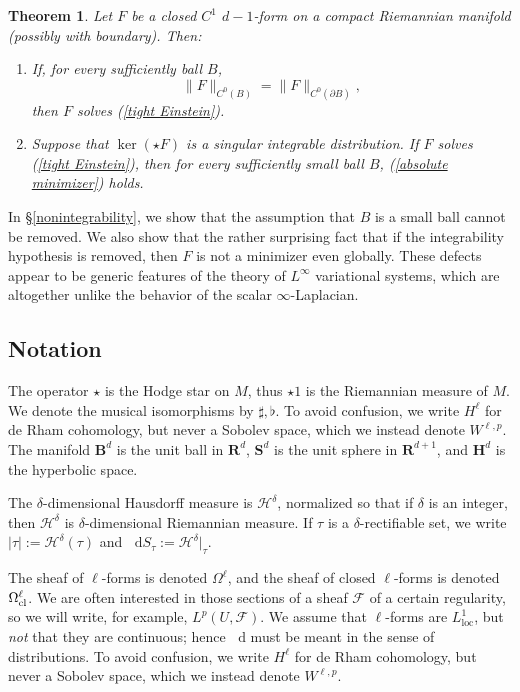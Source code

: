 \documentclass[reqno,11pt]{amsart}
\newcommand{\RR}{\mathbf{R}}
\newcommand{\Hyp}{\mathbf H}
\newcommand{\Sph}{\mathbf S}
\newcommand{\Ball}{\mathbf{B}}
\newcommand*\dif{\mathop{}\!\mathrm{d}}
\newcommand{\loc}{\mathrm{loc}}
\newtheorem{mainthm}{Theorem}
\theoremstyle{definition}
\numberwithin{equation}{section}
\begin{document}
\begin{mainthm}\label{tight are absolute minimizers}
Let $F$ be a closed $C^1$ $d - 1$-form on a compact Riemannian manifold (possibly with boundary). Then:
\begin{enumerate}
\item If, for every sufficiently ball $B$,
\begin{equation}\label{absolute minimizer}
\|F\|_{C^0(B)} = \|F\|_{C^0(\partial B)},
\end{equation}
then $F$ solves (\ref{tight Einstein}).
\item Suppose that $\ker(\star F)$ is a singular integrable distribution. If $F$ solves (\ref{tight Einstein}), then for every sufficiently small ball $B$, (\ref{absolute minimizer}) holds.
\end{enumerate}
\end{mainthm}

In \S\ref{nonintegrability}, we show that the assumption that $B$ is a small ball cannot be removed.
We also show that the rather surprising fact that if the integrability hypothesis is removed, then $F$ is not a minimizer even globally.
These defects appear to be generic features of the theory of $L^\infty$ variational systems, which are altogether unlike the behavior of the scalar $\infty$-Laplacian.

\subsection{Notation}
The operator $\star$ is the Hodge star on $M$, thus $\star 1$ is the Riemannian measure of $M$.
We denote the musical isomorphisms by $\sharp, \flat$.
To avoid confusion, we write $H^\ell$ for de Rham cohomology, but never a Sobolev space, which we instead denote $W^{\ell, p}$.
The manifold $\Ball^d$ is the unit ball in $\RR^d$, $\Sph^d$ is the unit sphere in $\RR^{d + 1}$, and $\Hyp^d$ is the hyperbolic space.

The $\delta$-dimensional Hausdorff measure is $\mathcal H^\delta$, normalized so that if $\delta$ is an integer, then $\mathcal H^\delta$ is $\delta$-dimensional Riemannian measure.
If $\tau$ is a $\delta$-rectifiable set, we write $|\tau| := \mathcal H^\delta(\tau)$ and $\dif S_\tau := \mathcal H^\delta|_\tau$.

The sheaf of $\ell$-forms is denoted $\Omega^\ell$, and the sheaf of closed $\ell$-forms is denoted $\Omega^\ell_{\rm cl}$.
We are often interested in those sections of a sheaf $\mathscr F$ of a certain regularity, so we will write, for example, $L^p(U, \mathscr F)$.
We assume that $\ell$-forms are $L^1_\loc$, but \emph{not} that they are continuous; hence $\dif$ must be meant in the sense of distributions.
To avoid confusion, we write $H^\ell$ for de Rham cohomology, but never a Sobolev space, which we instead denote $W^{\ell, p}$.
\end{document}
